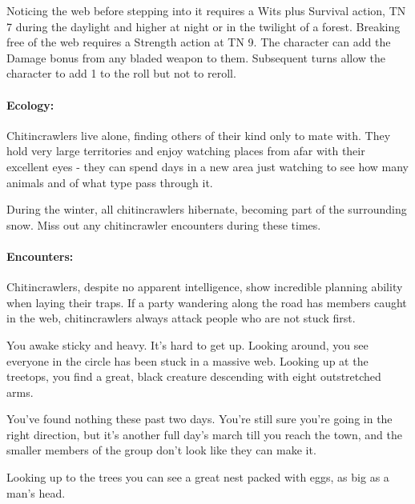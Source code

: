 Noticing the web before stepping into it requires a Wits plus Survival action, TN 7 during the daylight and higher at night or in the twilight of a forest.  Breaking free of the web requires a Strength action at TN 9.  The character can add the Damage bonus from any bladed weapon to them.  Subsequent turns allow the character to add 1 to the roll but not to reroll.

\paragraph{Ecology:} Chitincrawlers live alone, finding others of their kind only to mate with.  They hold very large territories and enjoy watching places from afar with their excellent eyes - they can spend days in a new area just watching to see how many animals and of what type pass through it.

During the winter, all chitincrawlers hibernate, becoming part of the surrounding snow.  Miss out any chitincrawler encounters during these times.

\paragraph{Encounters:} Chitincrawlers, despite no apparent intelligence, show incredible planning ability when laying their traps.  If a party wandering along the road has members caught in the web, chitincrawlers always attack people who are not stuck first.

\begin{boxtext}

You awake sticky and heavy.  It's hard to get up.  Looking around, you see everyone in the circle has been stuck in a massive web.  Looking up at the treetops, you find a great, black creature descending with eight outstretched arms.

\end{boxtext}

\label{griffin}

\griffin

\begin{boxtext}

	You've found nothing these past two days.  You're still sure you're going in the right direction, but it's another full day's march till you reach the town, and the smaller members of the group don't look like they can make it.

	Looking up to the trees you can see a great nest packed with eggs, as big as a man's head.

\end{boxtext}

